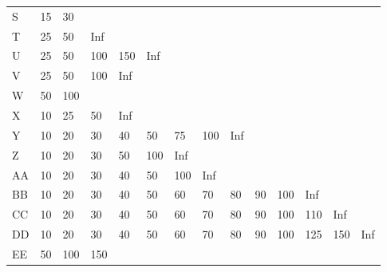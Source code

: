 \begin{table}[]
\begin{tabular}{l|lllllllllllll}
		S      & 15  & 30  &     &     &     &     &     &     &    &     &     &     &     \\
		T      & 25  & 50  & Inf &     &     &     &     &     &    &     &     &     &     \\
		U      & 25  & 50  & 100 & 150 & Inf &     &     &     &    &     &     &     &     \\
		V      & 25  & 50  & 100 & Inf &     &     &     &     &    &     &     &     &     \\
		W      & 50  & 100 &     &     &     &     &     &     &    &     &     &     &     \\
		X      & 10  & 25  & 50  & Inf &     &     &     &     &    &     &     &     &     \\
		Y      & 10  & 20  & 30  & 40  & 50  & 75  & 100 & Inf &    &     &     &     &     \\
		Z      & 10  & 20  & 30  & 50  & 100 & Inf &     &     &    &     &     &     &     \\
		AA     & 10  & 20  & 30  & 40  & 50  & 100 & Inf &     &    &     &     &     &     \\
		BB     & 10  & 20  & 30  & 40  & 50  & 60  & 70  & 80  & 90 & 100 & Inf &     &     \\
		CC     & 10  & 20  & 30  & 40  & 50  & 60  & 70  & 80  & 90 & 100 & 110 & Inf &     \\
		DD     & 10  & 20  & 30  & 40  & 50  & 60  & 70  & 80  & 90 & 100 & 125 & 150 & Inf \\
		EE     & 50  & 100 & 150 &     &     &     &     &     &    &     &     &     &    
	\end{tabular}
\end{table}




